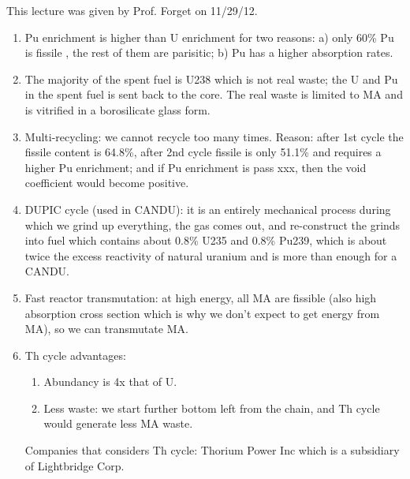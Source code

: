 \documentclass{school-22.211-notes}
\begin{document}
\clearpage
{}
This lecture was given by Prof. Forget on 11/29/12. 
\begin{enumerate}

\item Pu enrichment is higher than U enrichment for two reasons: a) only 60\% Pu is fissile , the rest of them are parisitic; b) Pu has a higher absorption rates. 

\item The majority of the spent fuel is U238 which is not real waste; the U and Pu in the spent fuel is sent back to the core. The real waste is limited to MA and is vitrified in a borosilicate glass form. 

\item Multi-recycling: we cannot recycle too many times. Reason: after 1st cycle the fissile content is 64.8\%, after 2nd cycle fissile is only 51.1\% and requires a higher Pu enrichment; and if Pu enrichment is pass xxx, then the void coefficient would become positive. 

\item DUPIC cycle (used in CANDU): it is an entirely mechanical process during which we grind up everything, the gas comes out, and re-construct the grinds into fuel which contains about 0.8\% U235 and 0.8\% Pu239, which is about twice the excess reactivity of natural uranium and is more than enough for a CANDU.

\item Fast reactor transmutation: at high energy, all MA are fissible (also high absorption cross section which is why we don't expect to get energy from MA), so we can transmutate MA.  


\item Th cycle advantages: 
\begin{enumerate}
\item Abundancy is 4x that of U. 
\item Less waste:  we start further bottom left from the chain, and Th cycle would generate less MA waste. 

\end{enumerate}
Companies that considers Th cycle: Thorium Power Inc which is a subsidiary of Lightbridge Corp. 
\end{enumerate}
\end{document}
